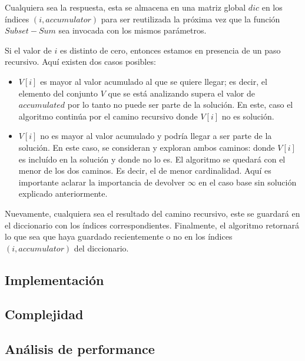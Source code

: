 Cualquiera sea la respuesta, esta se almacena en una matriz global $dic$ en los índices $(i, accumulator)$ para ser reutilizada la próxima vez que la función $Subset-Sum$ sea invocada con los mismos parámetros.

\vskip 8pt

Si el valor de $i$ es distinto de cero, entonces estamos en presencia de un paso recursivo. Aquí existen dos casos posibles:
\begin{itemize}
	\item $V[i]$ es mayor al valor acumulado al que se quiere llegar; es decir, el elemento del conjunto $V$ que se está analizando supera el valor de $accumulated$ por lo tanto no puede ser parte de la solución. En este, caso el algoritmo continúa por el camino recursivo donde $V[i]$ no es solución.
	\item $V[i]$ no es mayor al valor acumulado y podría llegar a ser parte de la solución. En este caso, se consideran y exploran ambos caminos: donde $V[i]$ es incluído en la solución y donde no lo es. El algoritmo se quedará con el menor de los dos caminos. Es decir, el de menor cardinalidad. Aquí es importante aclarar la importancia de devolver $\infty$ en el caso base sin solución explicado anteriormente.
\end{itemize}
Nuevamente, cualquiera sea el resultado del camino recursivo, este se guardará en el diccionario con los índices correspondientes. Finalmente, el algoritmo retornará lo que sea que haya guardado recientemente o no en los índices $(i, accumulator)$ del diccionario.

\subsection{Implementación}
\subsection{Complejidad}
\subsection{Análisis de performance}